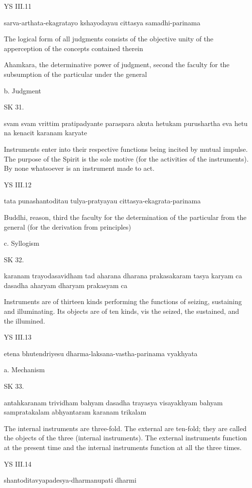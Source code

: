 YS III.11

    sarva-arthata-ekagratayo kshayodayau cittasya samadhi-parinama

    The logical form of all judgments consists of the objective unity of
    the apperception of the concepts contained therein

    Ahamkara, the determinative power of judgment, second the faculty for the subsumption of the particular under the general

    b. Judgment

SK 31.

svam svam vrittim pratipadyante paraspara akuta hetukam
purushartha eva hetu na kenacit karanam karyate

Instruments enter into their respective functions being incited by mutual impulse.
The purpose of the Spirit is the sole motive (for the activities of the instruments).
By none whatsoever is an instrument made to act.

YS III.12

    tata punashantoditau tulya-pratyayau cittasya-ekagrata-parinama

    Buddhi, reason, third the faculty for the determination of the particular from the general (for the derivation from principles)

    c. Syllogism

SK 32.

karanam trayodasavidham tad aharana dharana prakasakaram
tasya karyam ca dasadha aharyam dharyam prakasyam ca

Instruments are of thirteen kinds performing the functions of
seizing, sustaining and illuminating.
Its objects are of ten kinds, vis
the seized, the sustained, and the illumined.

YS III.13

    etena bhutendriyesu dharma-laksana-vastha-parinama vyakhyata

    a. Mechanism

SK 33.

antahkaranam trividham bahyam dasadha trayasya visayakhyam
bahyam sampratakalam abhyantaram karanam trikalam

The internal instruments are three-fold.
The external are ten-fold; they are called the objects of the three (internal instruments).
The external instruments function at the present time and
the internal instruments function at all the three times.

YS III.14

    shantoditavyapadesya-dharmanupati dharmi

